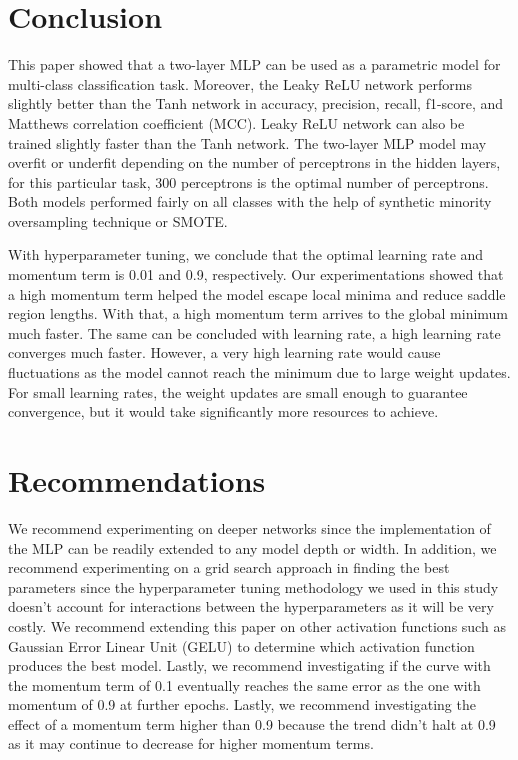 \documentclass{acm_proc_article-sp}
\begin{document}
\section{Conclusion}
This paper showed that a two-layer MLP can be used as a parametric model for multi-class classification task. Moreover, the Leaky ReLU network performs slightly better than the Tanh network in accuracy, precision, recall, f1-score, and Matthews correlation coefficient (MCC). Leaky ReLU network can also be trained slightly faster than the Tanh network. The two-layer MLP model may overfit or underfit depending on the number of perceptrons in the hidden layers, for this particular task, 300 perceptrons is the optimal number of perceptrons. Both models performed fairly on all classes with the help of synthetic minority oversampling technique or SMOTE.

With hyperparameter tuning, we conclude that the optimal learning rate and momentum term is 0.01 and 0.9, respectively. Our experimentations showed that a high momentum term helped the model escape local minima and reduce saddle region lengths. With that, a high momentum term arrives to the global minimum much faster. The same can be concluded with learning rate, a high learning rate converges much faster. However, a very high learning rate would cause fluctuations as the model cannot reach the minimum due to large weight updates. For small learning rates, the weight updates are small enough to guarantee convergence, but it would take significantly more resources to achieve.


\section{Recommendations}
We recommend experimenting on deeper networks since the implementation of the MLP can be readily extended to any model depth or width. In addition, we recommend experimenting on a grid search approach in finding the best parameters since the hyperparameter tuning methodology we used in this study doesn't account for interactions between the hyperparameters as it will be very costly. We recommend extending this paper on other activation functions such as Gaussian Error Linear Unit (GELU) to determine which activation function produces the best model. Lastly, we recommend investigating if the curve with the momentum term of 0.1 eventually reaches the same error as the one with momentum of 0.9 at further epochs. Lastly, we recommend investigating the effect of a momentum term higher than 0.9 because the trend didn't halt at 0.9 as it may continue to decrease for higher momentum terms.
\end{document}
